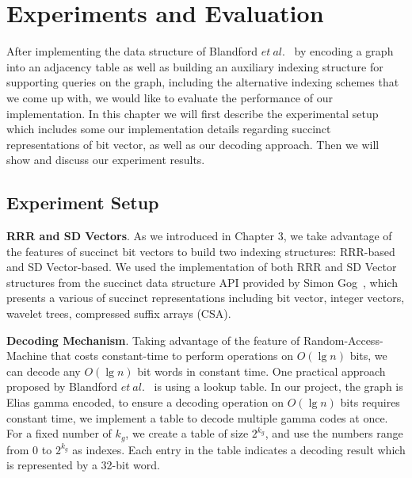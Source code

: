 \documentclass[12pt,glossary]{dalthesis}
\begin{document}
\chapter{Experiments and Evaluation}
After implementing the data structure of Blandford $et \ al.$~\cite{compact-representation} by encoding a graph into an adjacency table as well as building an auxiliary indexing structure for supporting queries on the graph, including the alternative indexing schemes that we come up with, we would like to evaluate the performance of our implementation. In this chapter we will first describe the experimental setup which includes some our implementation details regarding succinct representations of bit vector, as well as our decoding approach. Then we will show and discuss our experiment results.

\bigskip
 
\section{Experiment Setup}

\bigskip
\textbf{RRR and SD Vectors}. As we introduced in Chapter 3, we take advantage of the features of succinct bit vectors to build two indexing structures: RRR-based and SD Vector-based. We used the implementation of both RRR and SD Vector structures from the succinct data structure API provided by Simon Gog~\cite{sdsl}, which presents a various of succinct representations including bit vector, integer vectors, wavelet trees, compressed suffix arrays (CSA). 

\bigskip
\bigskip

\textbf{Decoding Mechanism}. Taking advantage of the feature of Random-Access-Machine that costs constant-time to perform operations on $O(\lg n)$ bits, we can decode any $O(\lg n)$ bit words in constant time. One practical approach proposed by Blandford $et \ al.$~\cite{compact-representation} is using a lookup table. In our project, the graph is Elias gamma encoded, to ensure a decoding operation on $O(\lg n)$ bits requires constant time, we implement a table to decode multiple gamma codes at once. For a fixed number of $k_{g}$, we create a table of size $2^{k_{g}}$, and use the numbers range from 0 to $2^{k_{g}}$ as indexes. Each entry in the table indicates a decoding result which is represented by a 32-bit word.  

\bigskip
\end{document}

